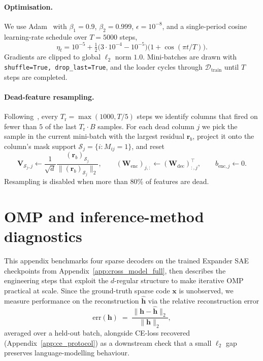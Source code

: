 \documentclass{article}
\theoremstyle{plain}
\theoremstyle{definition}
\theoremstyle{remark}
\begin{document}
\paragraph{Optimisation.} We use Adam~\citep{kingma2015adam} with $\beta_1 = 0.9$, $\beta_2 = 0.999$, $\epsilon = 10^{-8}$, and a single-period cosine learning-rate schedule over $T = 5000$ steps,
\begin{equation}
    \label{eq:lr}
    \eta_t = 10^{-5} + \tfrac12 \bigl(3 \cdot 10^{-4} - 10^{-5}\bigr)\bigl(1 + \cos(\pi t / T)\bigr).
\end{equation}
Gradients are clipped to global $\ell_2$ norm $1.0$. Mini-batches are drawn with \texttt{shuffle=True, drop\_last=True}, and the loader cycles through $\mathcal{D}_{\mathrm{train}}$ until $T$ steps are completed.

\paragraph{Dead-feature resampling.} Following~\citet{bricken2023monosemanticity, gao2024scaling}, every $T_{\mathrm{r}} = \max(1000, T/5)$ steps we identify columns that fired on fewer than $5$ of the last $T_{\mathrm{r}} \cdot B$ samples. For each dead column $j$ we pick the sample in the current mini-batch with the largest residual $\mathbf{r}_b$, project it onto the column's mask support $\mathcal{S}_j = \{i : M_{ij} = 1\}$, and reset
\begin{equation}
    \label{eq:resample}
    \mathbf{V}_{\mathcal{S}_j, j} \leftarrow \frac{1}{\sqrt{d}} \frac{(\mathbf{r}_b)_{\mathcal{S}_j}}{\lVert (\mathbf{r}_b)_{\mathcal{S}_j} \rVert_2}, \qquad
    (\mathbf{W}_{\mathrm{enc}})_{j,:} \leftarrow (\mathbf{W}_{\mathrm{dec}})_{:,j}^{\top}, \qquad
    b_{\mathrm{enc}, j} \leftarrow 0.
\end{equation}
Resampling is disabled when more than $80\%$ of features are dead.




\section{OMP and inference-method diagnostics}
\label{app:omp}

This appendix benchmarks four sparse decoders on the trained Expander SAE checkpoints from Appendix~\ref{app:cross_model_full}, then describes the engineering steps that exploit the $d$-regular structure to make iterative OMP practical at scale. Since the ground-truth sparse code $\mathbf{x}$ is unobserved, we measure performance on the reconstruction $\hat{\mathbf{h}}$ via the relative reconstruction error
\begin{equation}
    \label{eq:relerr}
    \mathrm{err}(\mathbf{h}) \;=\; \frac{\lVert \mathbf{h} - \hat{\mathbf{h}} \rVert_2}{\lVert \mathbf{h} \rVert_2},
\end{equation}
averaged over a held-out batch, alongside CE-loss recovered (Appendix~\ref{app:ce_protocol}) as a downstream check that a small $\ell_2$ gap preserves language-modelling behaviour.
\end{document}
